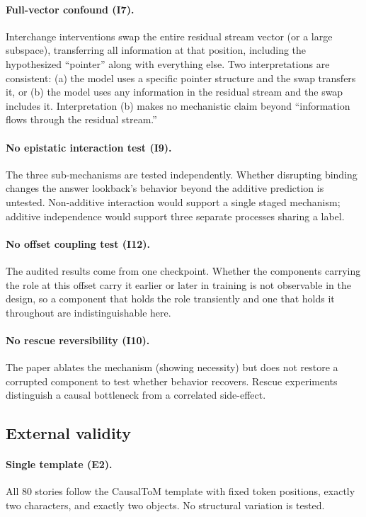\documentclass{article}
\begin{document}
\paragraph{Full-vector confound (I7).}
Interchange interventions swap the entire residual stream vector (or a large subspace), transferring all information at that position, including the hypothesized ``pointer'' along with everything else. Two interpretations are consistent: (a) the model uses a specific pointer structure and the swap transfers it, or (b) the model uses any information in the residual stream and the swap includes it. Interpretation (b) makes no mechanistic claim beyond ``information flows through the residual stream.''

\paragraph{No epistatic interaction test (I9).}
The three sub-mechanisms are tested independently. Whether disrupting binding changes the answer lookback's behavior beyond the additive prediction is untested. Non-additive interaction would support a single staged mechanism; additive independence would support three separate processes sharing a label.

\paragraph{No offset coupling test (I12).}
The audited results come from one checkpoint. Whether the components carrying the role at
this offset carry it earlier or later in training is not observable in the design, so a
component that holds the role transiently and one that holds it throughout are
indistinguishable here.

\paragraph{No rescue reversibility (I10).}
The paper ablates the mechanism (showing necessity) but does not restore a corrupted component to test whether behavior recovers. Rescue experiments distinguish a causal bottleneck from a correlated side-effect.

\subsection{External validity}

\paragraph{Single template (E2).}
All 80 stories follow the CausalToM template with fixed token positions, exactly two characters, and exactly two objects. No structural variation is tested.
\end{document}
